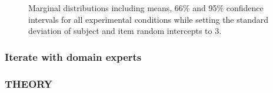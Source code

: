 \documentclass[
  man,
  floatsintext,
  longtable,
  a4paper,
  nolmodern,
  notxfonts,
  notimes,
  colorlinks=true,linkcolor=blue,citecolor=blue,urlcolor=blue]{apa7}
\begin{document}
\label{cell-fig-margdist3}
\begin{figure}[H]

\caption{\label{fig-margdist3}Marginal distributions including means,
66\% and 95\% confidence intervals for all experimental conditions while
setting the standard deviation of subject and item random intercepts to
3.}


\end{figure}%

\subsubsection{Iterate with domain
experts}\label{iterate-with-domain-experts}

\subsubsection{THEORY}\label{theory-5}
\end{document}
